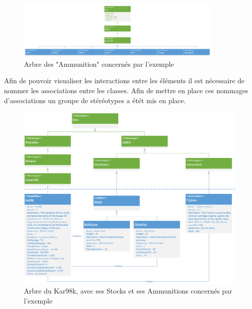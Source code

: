 \begin{figure}[H]
    \centering
    \includegraphics[width=10cm]{10_img/chap6/ammunitions.PNG} 
    \caption{Arbre des "Ammunition" concernés par l'exemple}
\end{figure}


Afin de pouvoir visualiser les interactions entre les éléments il est nécessaire de nommer les associations entre les classes. Afin de mettre en place ces nommages d'associations un groupe de stéréotypes a étét mis en place.


\begin{figure}[H]
    \centering
    \includegraphics[width=14cm]{10_img/chap6/Kar98k_stock_ammunition_links.PNG} 
    \caption{Arbre du Kar98k, avec ses Stocks et ses Ammunitions concernés par l'exemple}
\end{figure}


